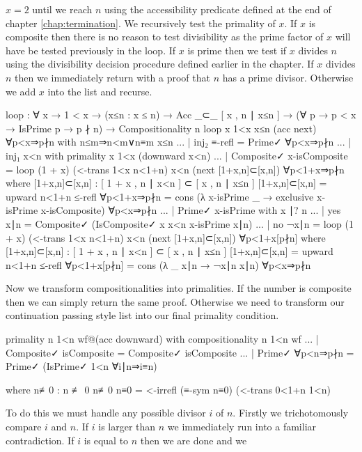 \documentclass[./Thesis.tex]{subfiles}
\begin{document}
$x = 2$
until we reach $n$ using the accessibility predicate defined at the end of chapter
\ref{chap:termination}. We recursively test the primality of $x$. If $x$ is
composite then there is no reason to test divisibility as the prime factor of
$x$ will have be tested previously in the loop. If $x$ is prime then we test if
$x$ divides $n$ using the divisibility decision procedure defined earlier in the
chapter. If $x$ divides $n$ then we immediately return with a proof that $n$ has
a prime divisor. Otherwise we add $x$ into the list and recurse.
\begin{code}
    loop
      : ∀ x → 1 < x → (x≤n : x ≤ n) → Acc _⊂_ [ x , n ∣ x≤n ]
      → (∀ {p} → p < x → IsPrime p → p ∤ n)
      → Compositionality n
    loop x 1<x x≤n (acc next) ∀p<x⇒p∤n with n≤m⇒n<m∨n≡m x≤n
    ... | inj₂ ≡-refl = Prime✓ ∀p<x⇒p∤n
    ... | inj₁ x<n with primality x 1<x (downward x<n)
    ...   | Composite✓ x-isComposite
          = loop (1 + x) (<-trans 1<x n<1+n) x<n (next [1+x,n]⊂[x,n]) ∀p<1+x⇒p∤n
            where
            [1+x,n]⊂[x,n] : [ 1 + x , n ∣ x<n ] ⊂ [ x , n ∣ x≤n ]
            [1+x,n]⊂[x,n] = upward n<1+n ≤-refl
            ∀p<1+x⇒p∤n = cons (λ x-isPrime _ → exclusive x-isPrime x-isComposite) ∀p<x⇒p∤n
    ...   | Prime✓ x-isPrime with x ∣? n
    ...     | yes x∣n = Composite✓ (IsComposite✓ x x<n x-isPrime x∣n)
    ...     | no ¬x∣n = loop (1 + x) (<-trans 1<x n<1+n) x<n (next [1+x,n]⊂[x,n]) ∀p<1+x[p∤n]
            where
            [1+x,n]⊂[x,n] : [ 1 + x , n ∣ x<n ] ⊂ [ x , n ∣ x≤n ]
            [1+x,n]⊂[x,n] = upward n<1+n ≤-refl
            ∀p<1+x[p∤n] = cons (λ _ x∣n → ¬x∣n x∣n) ∀p<x⇒p∤n
\end{code}
Now we transform compositionalities into primalities. If the number is
composite then we can simply return the same proof. Otherwise we need to
transform our continuation passing style list into our final primality condition.
\begin{code}
  primality n 1<n wf@(acc downward) with compositionality n 1<n wf
  ... | Composite✓ isComposite = Composite✓ isComposite
  ... | Prime✓ ∀p<n⇒p∤n = Prime✓ (IsPrime✓ 1<n ∀i∣n⇒i≡n)
\end{code}
\begin{code}[hide]
    where
    n≢0 : n ≢ 0
    n≢0 n≡0 = <-irrefl (≡-sym n≡0) (<-trans 0<1+n 1<n)
\end{code}
To do this we must handle any possible divisor $i$ of $n$. Firstly we
trichotomously compare $i$ and $n$. If $i$ is larger than $n$ we immediately run
into a familiar contradiction. If $i$ is equal to $n$ then we are done and we
\end{document}
